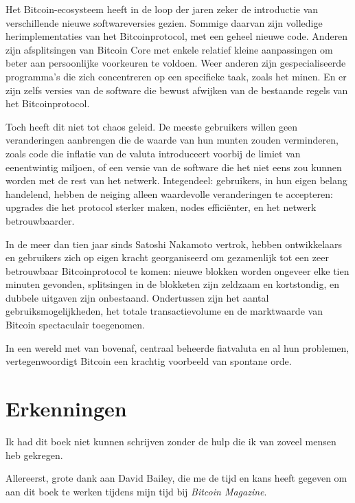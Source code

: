 \documentclass[
  a5paper,
  smalldemyvopaper,11pt,twoside,onecolumn,openright,extrafontsizes,
hidelinks]{memoir}
\begin{document}
Het Bitcoin-ecosysteem heeft in de loop der jaren zeker de introductie
van verschillende nieuwe softwareversies gezien. Sommige daarvan zijn
volledige herimplementaties van het Bitcoinprotocol, met een geheel
nieuwe code. Anderen zijn afsplitsingen van Bitcoin Core met enkele
relatief kleine aanpassingen om beter aan persoonlijke voorkeuren te
voldoen. Weer anderen zijn gespecialiseerde programma's die zich
concentreren op een specifieke taak, zoals het minen. En er zijn zelfs
versies van de software die bewust afwijken van de bestaande regels van
het Bitcoinprotocol.

Toch heeft dit niet tot chaos geleid. De meeste gebruikers willen geen
veranderingen aanbrengen die de waarde van hun munten zouden
verminderen, zoals code die inflatie van de valuta introduceert voorbij
de limiet van eenentwintig miljoen, of een versie van de software die
het niet eens zou kunnen worden met de rest van het netwerk.
Integendeel: gebruikers, in hun eigen belang handelend, hebben de
neiging alleen waardevolle veranderingen te accepteren: upgrades die het
protocol sterker maken, nodes efficiënter, en het netwerk
betrouwbaarder.

In de meer dan tien jaar sinds Satoshi Nakamoto vertrok, hebben
ontwikkelaars en gebruikers zich op eigen kracht georganiseerd om
gezamenlijk tot een zeer betrouwbaar Bitcoinprotocol te komen: nieuwe
blokken worden ongeveer elke tien minuten gevonden, splitsingen in de
blokketen zijn zeldzaam en kortstondig, en dubbele uitgaven zijn
onbestaand. Ondertussen zijn het aantal gebruiksmogelijkheden, het
totale transactievolume en de marktwaarde van Bitcoin spectaculair
toegenomen.

In een wereld met van bovenaf, centraal beheerde fiatvaluta en al hun
problemen, vertegenwoordigt Bitcoin een krachtig voorbeeld van spontane
orde.

\chapter*{Erkenningen}\label{erkenningen}


Ik had dit boek niet kunnen schrijven zonder de hulp die ik van zoveel
mensen heb gekregen.

Allereerst, grote dank aan David Bailey, die me de tijd en kans heeft
gegeven om aan dit boek te werken tijdens mijn tijd bij \emph{Bitcoin
Magazine}.
\end{document}
